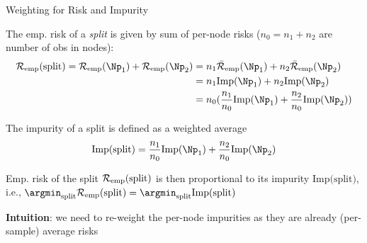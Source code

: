 \documentclass[11pt,compress,t,notes=noshow, xcolor=table]{beamer}
\begin{document}
\begin{framei}[sep=M]{Weighting for Risk and Impurity}

\item The emp. risk of a \emph{split} is given by sum of per-node risks ($n_0 = n_1 + n_2$ are number of obs in nodes): 
\begin{align*}
\riske(\text{split}) = \riske(\Np_1) + \riske(\Np_2) & = n_1 \riskeb(\Np_1) + n_2 \riskeb(\Np_2) \\
& =  n_1 \text{Imp}(\Np_1) + n_2 \text{Imp}(\Np_2) \\
& = n_0 (\frac{n_1}{n_0} \text{Imp}(\Np_1) + \frac{n_2}{n_0} \text{Imp}(\Np_2))
\end{align*}

\item The impurity of a split is defined as a weighted average
$$\text{Imp(split)} = \frac{n_1}{n_0} \text{Imp}(\Np_1) + \frac{n_2}{n_0} \text{Imp}(\Np_2)$$

\item Emp. risk of the split $\mathcal{R}_{\text{emp}}(\text{split})$ is then proportional to its impurity $\text{Imp(split)}$, i.e., $\argmin_\text{split} \riske(\text{split}) = \argmin_\text{split} \text{Imp(split)}$ 

\item \textbf{Intuition}: we need to re-weight the per-node impurities as they are already (per-sample) average risks




\end{framei}


\endlecture
\end{document}
